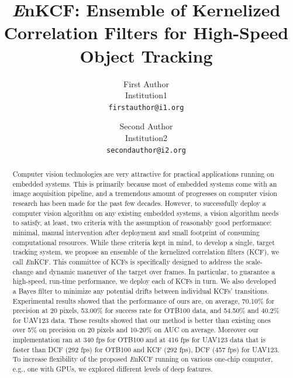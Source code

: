\documentclass[10pt,twocolumn,letterpaper]{article}
\begin{document}
\title{{\it E}nKCF: Ensemble of Kernelized Correlation Filters for
  High-Speed Object Tracking}

\author{First Author \\
Institution1\\
{\tt\small firstauthor@i1.org}
\and
Second Author \\
Institution2\\
{\tt\small secondauthor@i2.org}
}

\maketitle
\ifwacvfinal\thispagestyle{empty}\fi

\begin{abstract}
Computer vision technologies are very attractive for practical
applications running on embedded systems. This is primarily because
most of embedded systems come with an image acquisition pipeline, and
a tremendous amount of progresses on computer vision research has been
made for the past few decades. However, to successfully deploy a
computer vision algorithm on any existing embedded systems, a vision
algorithm needs to satisfy, at least, two criteria with the assumption
of reasonably good performance: minimal, manual intervention after
deployment and small footprint of consuming computational
resources. While these criteria kept in mind, to develop a single,
target tracking system, we propose an ensemble of the kernelized
correlation filters (KCF), we call {\it E}nKCF. This committee of KCFs
is specifically designed to address the scale-change and dynamic
maneuver of the target over frames. In particular, to guarantee a
high-speed, run-time performance, we deploy each of KCFs in turn. We
also developed a Bayes filter to minimize any potential drifts between
individual KCFs' transitions. Experimental results showed that the
performance of ours are, on average, 70.10\% for precision at 20
pixels, 53.00\% for success rate for OTB100 data, and 54.50\% and
40.2\% for UAV123 data. These results showed that our method is better
than existing ones over 5\% on precision on 20 pixels and 10-20\% on
AUC on average. Moreover our implementation ran at 340 fps for OTB100
and at 416 fps for UAV123 data that is faster than DCF (292 fps) for
OTB100 and KCF (292 fps), DCF (457 fps) for UAV123. To increase
flexibility of the proposed {\it E}nKCF running on various one-chip
computer, e.g., one with GPUs, we explored different levels of deep
features.
\end{abstract}
\end{document}

